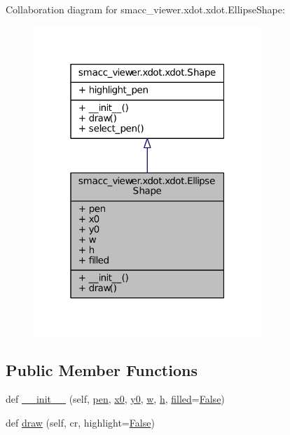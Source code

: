 Collaboration diagram for smacc\+\_\+viewer.\+xdot.\+xdot.\+Ellipse\+Shape\+:
\nopagebreak
\begin{figure}[H]
\begin{center}
\leavevmode
\includegraphics[width=244pt]{classsmacc__viewer_1_1xdot_1_1xdot_1_1EllipseShape__coll__graph}
\end{center}
\end{figure}
\subsection*{Public Member Functions}
\begin{DoxyCompactItemize}
\item 
def \hyperlink{classsmacc__viewer_1_1xdot_1_1xdot_1_1EllipseShape_afddb94c8eac5965029106c88667dcc31}{\+\_\+\+\_\+init\+\_\+\+\_\+} (self, \hyperlink{classsmacc__viewer_1_1xdot_1_1xdot_1_1EllipseShape_a4d04a594c784a4364ba27d247b47a951}{pen}, \hyperlink{classsmacc__viewer_1_1xdot_1_1xdot_1_1EllipseShape_a07cb1e682c863ae342c17263cd47d1c5}{x0}, \hyperlink{classsmacc__viewer_1_1xdot_1_1xdot_1_1EllipseShape_ac5b1c7c837f519afa1c005305ee823cb}{y0}, \hyperlink{classsmacc__viewer_1_1xdot_1_1xdot_1_1EllipseShape_af68f2823ce09ed7643269d10b0bbc886}{w}, \hyperlink{classsmacc__viewer_1_1xdot_1_1xdot_1_1EllipseShape_a2f7ac4a36e7a9a76cd8458a001dede67}{h}, \hyperlink{classsmacc__viewer_1_1xdot_1_1xdot_1_1EllipseShape_a3c929ec9287afe862e714a9190a04eda}{filled}=\hyperlink{namespacesmacc__viewer_a5928e8da279785cbab9011356c3eaa87}{False})
\item 
def \hyperlink{classsmacc__viewer_1_1xdot_1_1xdot_1_1EllipseShape_afa10be5f1a695b54b1bdf009fc5b9968}{draw} (self, cr, highlight=\hyperlink{namespacesmacc__viewer_a5928e8da279785cbab9011356c3eaa87}{False})
\end{DoxyCompactItemize}
